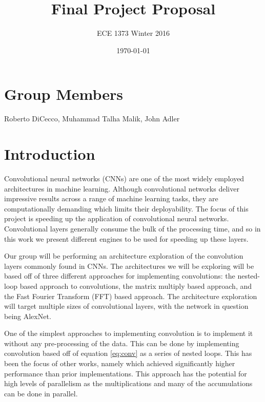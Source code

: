 \documentclass[conference,compsoc]{IEEEtran/IEEEtran}
\title{\bf Final Project Proposal}
\author{ECE 1373 Winter 2016}
\date{\today}
\begin{document}
\maketitle

\section{Group Members}
Roberto DiCecco, Muhammad Talha Malik, John Adler

\section{Introduction}\label{section:intro}

Convolutional neural networks (CNNs) are one of the most widely employed architectures in machine learning. Although convolutional networks deliver impressive results across a range of machine learning tasks, they are computationally demanding which limits their deployability. The focus of this project is speeding up the application of convolutional neural networks. Convolutional layers generally consume the bulk of the processing time, and so in this work we present different engines to be used for speeding up these layers.

Our group will be performing an architecture exploration of the convolution layers commonly found in
CNNs. The architectures we will be exploring will be based off of three
different approaches for implementing convolutions: the nested-loop based approach to convolutions,
the matrix multiply based approach, and the Fast Fourier Transform (FFT) based approach. The architecture
exploration will target multiple sizes of convolutional layers, with the network in question being AlexNet.

One of the simplest approaches to implementing convolution is to implement it without any pre-processing of the data.
This can be done by implementing convolution based off of equation \ref{eq:conv} as a series of nested loops. This has been
the focus of other works, namely \cite{conv_zhang} which achieved significantly higher performance than prior implementations.
This approach has the potential for high levels of parallelism as the multiplications and many of the accumulations can be done
in parallel.
\end{document}
